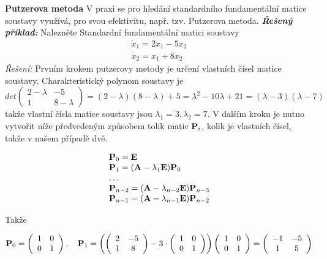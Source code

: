 {\bf Putzerova metoda}\newline
V praxi se pro hledání standardního fundamentální matice soustavy využívá, pro svou efektivitu, např. tzv. Putzerova metoda.\newline
{\it\bf Řešený příklad:}\newline %
Nalezněte Standardní fundamentální matici soustavy
\[
\begin{array}{c}
 \dot{x}_1 = 2x_1 - 5x_2\\
 \dot{x}_2 = x_1 + 8x_2
\end{array}
\]
{\it Řešení:}\newline
Prvním krokem putzerovy metody je určení vlastních čísel matice soustavy. Charakteristický polynom soustavy je
\[
 det\left(\begin{array}{cc} 2-\lambda & -5\\  1 & 8-\lambda \end{array}\right) = (2 - \lambda)(8 - \lambda) + 5 = \lambda^2 - 10 \lambda + 21 = (\lambda - 3)(\lambda - 7)
\]
takže vlastní čísla matice soustavy jsou $\lambda_1 = 3, \lambda_2 = 7$.\newline
V dalším kroku je nutno vytvořit níže předvedeným způsobem tolik matic ${\bf P}_i$, kolik je vlastních čísel, takže v našem případě dvě.
\begin{center}
\begin{equation*}
 \begin{array}{l}
  {\bf P}_0 = {\bf E}\\
  {\bf P}_1 = ({\bf A} - \lambda_1{\bf E}){\bf P}_0\\
  \ldots\\
  {\bf P}_{n-2} =  ({\bf A} - \lambda_{n-2}{\bf E}){\bf P}_{n-3}\\
  {\bf P}_{n-1} =  ({\bf A} - \lambda_{n-1}{\bf E}){\bf P}_{n-2}\\
 \end{array}
\end{equation*}
\end{center}
Takže
\begin{center}
\begin{equation*}
  {\bf P}_0 = \left(\begin{array}{cc} 1 & 0 \\ 0 & 1 \end{array}\right),\quad %
  {\bf P}_1 = \left(\left(\begin{array}{cc} 2 & -5\\  1 & 8 \end{array}\right) - 3\cdot\left(\begin{array}{cc} 1 & 0 \\ 0 & 1 \end{array}\right)\right)\left(\begin{array}{cc} 1 & 0 \\ 0 & 1 \end{array}\right) = \left(\begin{array}{cc} -1 & -5 \\ 1 & 5 \end{array}\right)
\end{equation*}
\end{center}
